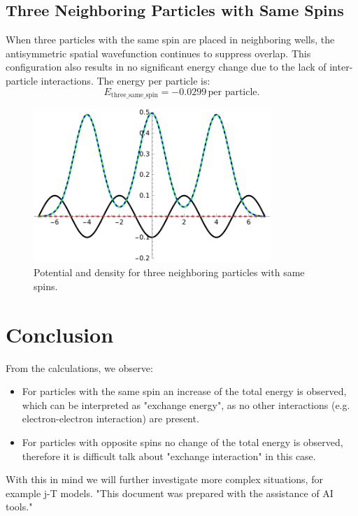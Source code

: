 \documentclass[11pt]{article}
\begin{document}
\subsection{Three Neighboring Particles with Same Spins}
When three particles with the same spin are placed in neighboring wells, the antisymmetric spatial wavefunction continues to suppress overlap. This configuration also results in no significant energy change due to the lack of inter-particle interactions. The energy per particle is:
\begin{equation}
E_\text{three\_same\_spin} = -0.0299 \, \text{per particle}.
\end{equation}

\begin{figure}[h]
    \centering
    \includegraphics[width=0.8\textwidth]{IMGthree_same_spin.pdf}
    \caption{Potential and density for three neighboring particles with same spins.}
    \label{fig:three_same_spin}
\end{figure}

\section{Conclusion}

From the calculations, we observe:
\begin{itemize}
    \item For particles with the same spin an increase of the total energy is observed, which can be interpreted as "exchange energy", as no other interactions (e.g. electron-electron interaction) are present.
    \item For particles with opposite spins no change of the total energy is observed, therefore it is difficult talk about "exchange interaction" in this case.
\end{itemize}

With this in mind we will further investigate more complex situations, for example j-T models. "This document was prepared with the assistance of AI tools."
\end{document}
